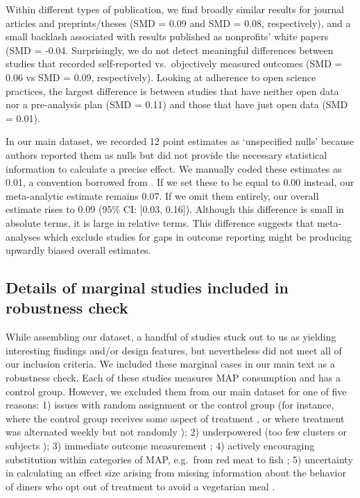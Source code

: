 \documentclass[preprint, 3p,
authoryear]{elsarticle} %
\begin{document}
Within different types of publication, we find broadly similar results
for journal articles and preprints/theses (SMD = 0.09 and SMD = 0.08,
respectively), and a small backlash associated with results published as
nonprofits' white papers (SMD = -0.04. Surprisingly, we do not detect
meaningful differences between studies that recorded self-reported
vs.~objectively measured outcomes (SMD = 0.06 vs SMD = 0.09,
respectively). Looking at adherence to open science practices, the
largest difference is between studies that have neither open data nor a
pre-analysis plan (SMD = 0.11) and those that have just open data (SMD =
0.01).

In our main dataset, we recorded 12 point estimates as `unspecified
nulls' because authors reported them as nulls but did not provide the
necessary statistical information to calculate a precise effect. We
manually coded these estimates as 0.01, a convention borrowed from
\citep{porat2024}. If we set these to be equal to 0.00 instead, our
meta-analytic estimate remains 0.07. If we omit them entirely, our
overall estimate rises to 0.09 (95\% CI: {[}0.03, 0.16{]}). Although
this difference is small in absolute terms, it is large in relative
terms. This difference suggests that meta-analyses which exclude studies
for gaps in outcome reporting might be producing upwardly biased overall
estimates.

\subsection{Details of marginal studies included in robustness
check}\label{details-of-marginal-studies-included-in-robustness-check}

While assembling our dataset, a handful of studies stuck out to us as
yielding interesting findings and/or design features, but nevertheless
did not meet all of our inclusion criteria. We included these marginal
cases in our main text as a robustness check. Each of these studies
measures MAP consumption and has a control group. However, we excluded
them from our main dataset for one of five reasons: 1) issues with
random assignment or the control group (for instance, where the control
group receives some aspect of treatment \citep{piazza2022}, or where
treatment was alternated weekly but not randomly \citep{garnett2020});
2) underpowered (too few clusters \citep{reinders2017} or subjects
\citep{lentz2020}); 3) immediate outcome measurement
\citep{dannenberg2023, sparkman2017, griesoph2021, hansen2021}; 4)
actively encouraging substitution within categories of MAP, e.g.~from
red meat to fish \citep{celis2017, johansen2009}; 5) uncertainty in
calculating an effect size arising from missing information about the
behavior of diners who opt out of treatment to avoid a vegetarian meal
\citep{betterfoodfoundation2023}.
\end{document}
